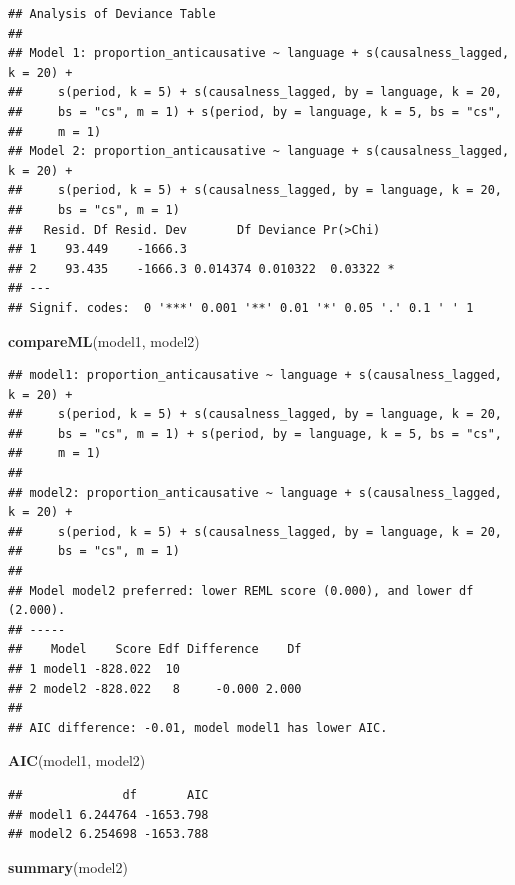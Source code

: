 \documentclass[
]{article}
\newenvironment{Shaded}{\begin{snugshade}}{\end{snugshade}}
\newcommand{\FunctionTok}[1]{\textcolor[rgb]{0.13,0.29,0.53}{\textbf{#1}}}
\newcommand{\NormalTok}[1]{#1}
\begin{document}
\begin{verbatim}
## Analysis of Deviance Table
## 
## Model 1: proportion_anticausative ~ language + s(causalness_lagged, k = 20) + 
##     s(period, k = 5) + s(causalness_lagged, by = language, k = 20, 
##     bs = "cs", m = 1) + s(period, by = language, k = 5, bs = "cs", 
##     m = 1)
## Model 2: proportion_anticausative ~ language + s(causalness_lagged, k = 20) + 
##     s(period, k = 5) + s(causalness_lagged, by = language, k = 20, 
##     bs = "cs", m = 1)
##   Resid. Df Resid. Dev       Df Deviance Pr(>Chi)  
## 1    93.449    -1666.3                             
## 2    93.435    -1666.3 0.014374 0.010322  0.03322 *
## ---
## Signif. codes:  0 '***' 0.001 '**' 0.01 '*' 0.05 '.' 0.1 ' ' 1
\end{verbatim}

\begin{Shaded}
\begin{Highlighting}[]
\FunctionTok{compareML}\NormalTok{(model1, model2)}
\end{Highlighting}
\end{Shaded}

\begin{verbatim}
## model1: proportion_anticausative ~ language + s(causalness_lagged, k = 20) + 
##     s(period, k = 5) + s(causalness_lagged, by = language, k = 20, 
##     bs = "cs", m = 1) + s(period, by = language, k = 5, bs = "cs", 
##     m = 1)
## 
## model2: proportion_anticausative ~ language + s(causalness_lagged, k = 20) + 
##     s(period, k = 5) + s(causalness_lagged, by = language, k = 20, 
##     bs = "cs", m = 1)
## 
## Model model2 preferred: lower REML score (0.000), and lower df (2.000).
## -----
##    Model    Score Edf Difference    Df
## 1 model1 -828.022  10                 
## 2 model2 -828.022   8     -0.000 2.000
## 
## AIC difference: -0.01, model model1 has lower AIC.
\end{verbatim}

\begin{Shaded}
\begin{Highlighting}[]
\FunctionTok{AIC}\NormalTok{(model1, model2)}
\end{Highlighting}
\end{Shaded}

\begin{verbatim}
##              df       AIC
## model1 6.244764 -1653.798
## model2 6.254698 -1653.788
\end{verbatim}

\begin{Shaded}
\begin{Highlighting}[]
\FunctionTok{summary}\NormalTok{(model2)}
\end{Highlighting}
\end{Shaded}
\end{document}
